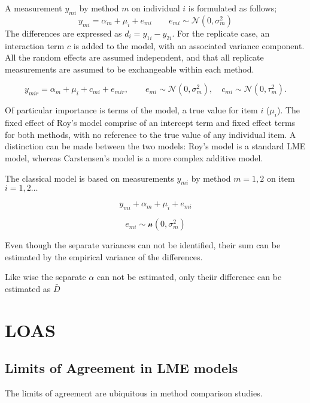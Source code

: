 \documentclass[12pt, a4paper]{report}
\theoremstyle{plain}
\theoremstyle{definition}
\theoremstyle{remark}
\begin{document}
A measurement $y_{mi}$ by method $m$ on individual $i$ is formulated as follows;
\begin{equation}
y_{mi}  = \alpha_{m} + \mu_{i} + e_{mi} \qquad  e_{mi} \sim
\mathcal{N}(0,\sigma^{2}_{m})
\end{equation}
The differences are expressed as $d_{i} = y_{1i} - y_{2i}$. For the replicate case, an interaction term $c$ is added to the model, with an associated variance component. All the random effects are assumed independent, and that all replicate measurements are assumed to be exchangeable within each method.

\begin{equation}
y_{mir}  = \alpha_{m} + \mu_{i} + c_{mi} + e_{mir}, \qquad  e_{mi}
\sim \mathcal{N}(0,\sigma^{2}_{m}), \quad c_{mi} \sim \mathcal{N}(0,\tau^{2}_{m}).
\end{equation}

Of particular importance is terms of the model, a true value for item $i$ ($\mu_{i}$).  The fixed effect of Roy's model comprise of an intercept term and fixed effect terms for both methods, with no reference to the true value of any individual item. A distinction can be made between the two models: Roy's model is a standard LME model, whereas Carstensen's model is a more complex additive model.

The classical model is based on measurements $y_{mi}$
by method $m=1,2$ on item $i = 1,2 \ldots$

\[y_{mi} + \alpha_{m} + \mu_{i} + e_{mi}\]

\[e_{mi} \sim \mathcal{n} (0,\sigma^2_m)\]

Even though the separate variances can not be
identified, their sum can be estimated by the empirical variance of the differences.

Like wise the separate $\alpha$ can not be
estimated, only theiir difference can be estimated as
$\bar{D}$


\chapter{LOAS}
\section{Limits of Agreement in LME models}
The limits of agreement \citep{BA86} are ubiquitous in method comparison studies. 
\end{document}

